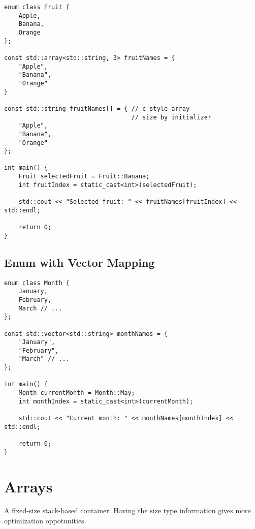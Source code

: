 \begin{verbatim}
enum class Fruit {
    Apple,
    Banana,
    Orange
};

const std::array<std::string, 3> fruitNames = {
    "Apple",
    "Banana",
    "Orange"
}

const std::string fruitNames[] = { // c-style array
                                   // size by initializer
    "Apple",
    "Banana",
    "Orange"
};

int main() {
    Fruit selectedFruit = Fruit::Banana;
    int fruitIndex = static_cast<int>(selectedFruit);

    std::cout << "Selected fruit: " << fruitNames[fruitIndex] << std::endl;

    return 0;
}
\end{verbatim}

\subsection{Enum with Vector Mapping}

\begin{verbatim}
enum class Month {
    January,
    February,
    March // ...
};

const std::vector<std::string> monthNames = {
    "January",
    "February",
    "March" // ... 
};

int main() {
    Month currentMonth = Month::May;
    int monthIndex = static_cast<int>(currentMonth);

    std::cout << "Current month: " << monthNames[monthIndex] << std::endl;

    return 0;
}
\end{verbatim}


\section{Arrays}

A fixed-size stack-based container. Having the size type information gives more optimization oppotunities.

